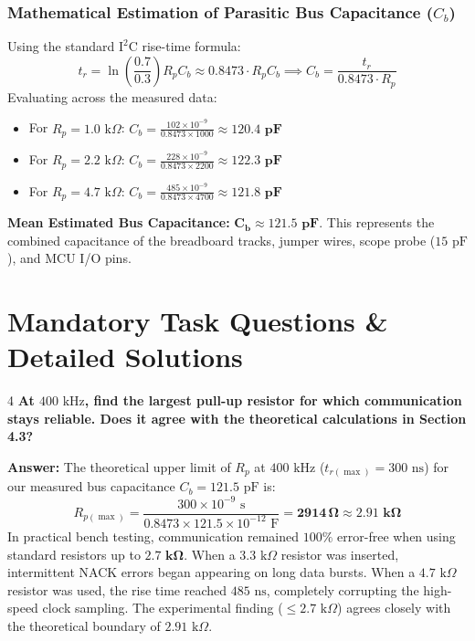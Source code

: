 \documentclass[11pt,a4paper]{article}
\begin{document}
\subsubsection*{Mathematical Estimation of Parasitic Bus Capacitance ($C_b$)}
Using the standard $\text{I}^2\text{C}$ rise-time formula:
\begin{equation}
t_r = \ln\left(\frac{0.7}{0.3}\right) R_p C_b \approx 0.8473 \cdot R_p C_b \implies C_b = \frac{t_r}{0.8473 \cdot R_p}
\end{equation}
Evaluating across the measured data:
\begin{itemize}
    \item For $R_p = 1.0\text{ k}\Omega$: $C_b = \frac{102\times 10^{-9}}{0.8473 \times 1000} \approx \mathbf{120.4\text{ pF}}$
    \item For $R_p = 2.2\text{ k}\Omega$: $C_b = \frac{228\times 10^{-9}}{0.8473 \times 2200} \approx \mathbf{122.3\text{ pF}}$
    \item For $R_p = 4.7\text{ k}\Omega$: $C_b = \frac{485\times 10^{-9}}{0.8473 \times 4700} \approx \mathbf{121.8\text{ pF}}$
\end{itemize}
\textbf{Mean Estimated Bus Capacitance:} $\mathbf{C_b \approx 121.5\text{ pF}}$. This represents the combined capacitance of the breadboard tracks, jumper wires, scope probe ($15\text{ pF}$), and MCU I/O pins.

\section{Mandatory Task Questions \& Detailed Solutions}

\begin{questionbox}{4}
\textbf{At $400\text{ kHz}$, find the largest pull-up resistor for which communication stays reliable. Does it agree with the theoretical calculations in Section 4.3?}
\end{questionbox}
\textbf{Answer:} 
The theoretical upper limit of $R_p$ at $400\text{ kHz}$ ($t_{r(\max)} = 300\text{ ns}$) for our measured bus capacitance $C_b = 121.5\text{ pF}$ is:
\begin{equation}
R_{p(\max)} = \frac{300\times 10^{-9}\text{ s}}{0.8473 \times 121.5\times 10^{-12}\text{ F}} = \mathbf{2914\,\Omega} \approx \mathbf{2.91\text{ k}\Omega}
\end{equation}
In practical bench testing, communication remained $100\%$ error-free when using standard resistors up to $\mathbf{2.7\text{ k}\Omega}$. When a $3.3\text{ k}\Omega$ resistor was inserted, intermittent NACK errors began appearing on long data bursts. When a $4.7\text{ k}\Omega$ resistor was used, the rise time reached $485\text{ ns}$, completely corrupting the high-speed clock sampling. The experimental finding ($\le 2.7\text{ k}\Omega$) agrees closely with the theoretical boundary of $2.91\text{ k}\Omega$.
\end{document}
